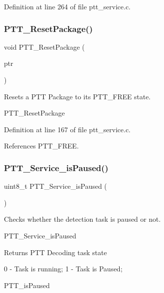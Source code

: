 Definition at line 264 of file ptt\+\_\+service.\+c.

\mbox{\label{group___p_t_t___service_gace2e54f065aefa03231ef49cd220d819}} 
\subsubsection{\texorpdfstring{P\+T\+T\+\_\+\+Reset\+Package()}{PTT\_ResetPackage()}}
{\footnotesize\ttfamily void P\+T\+T\+\_\+\+Reset\+Package (\begin{DoxyParamCaption}\item[{P\+T\+T\+Package\+\_\+\+Typedef $\ast$}]{ptr }\end{DoxyParamCaption})}



Resets a P\+TT Package to its P\+T\+T\+\_\+\+F\+R\+EE state. 

P\+T\+T\+\_\+\+Reset\+Package 

Definition at line 167 of file ptt\+\_\+service.\+c.



References P\+T\+T\+\_\+\+F\+R\+EE.

\mbox{\label{group___p_t_t___service_ga60ee4edcdd49ecb7eb5be5824ac798a8}} 
\subsubsection{\texorpdfstring{P\+T\+T\+\_\+\+Service\+\_\+is\+Paused()}{PTT\_Service\_isPaused()}}
{\footnotesize\ttfamily uint8\+\_\+t P\+T\+T\+\_\+\+Service\+\_\+is\+Paused (\begin{DoxyParamCaption}\item[{void}]{ }\end{DoxyParamCaption})}



Checks whether the detection task is paused or not. 

P\+T\+T\+\_\+\+Service\+\_\+is\+Paused \begin{DoxyReturn}{Returns}
P\+TT Decoding task state 
\begin{DoxyPre}
        0 - Task is running;
        1 - Task is Paused;
        \end{DoxyPre}

\end{DoxyReturn}
P\+T\+T\+\_\+is\+Paused 

